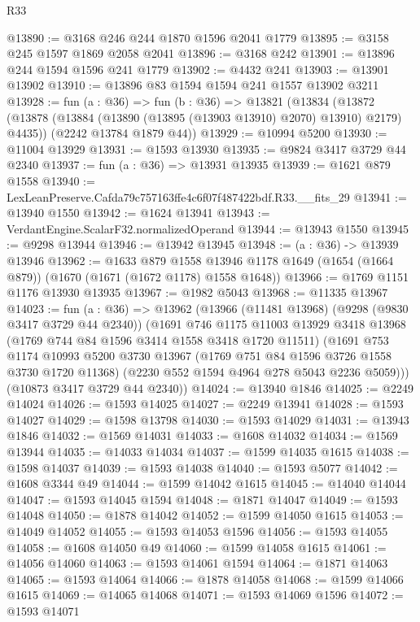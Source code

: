 \begin{lexlean}{R33}
\begin{coremodule}
@13890 := @3168 @246 @244 @1870 @1596 @2041 @1779
@13895 := @3158 @245 @1597 @1869 @2058 @2041
@13896 := @3168 @242
@13901 := @13896 @244 @1594 @1596 @241 @1779
@13902 := @4432 @241
@13903 := @13901 @13902
@13910 := @13896 @83 @1594 @1594 @241 @1557 @13902 @3211
@13928 := fun (a : @36) =>
  fun (b : @36) =>
  @13821
    (@13834
      (@13872 (@13878 (@13884 (@13890 (@13895 (@13903 @13910) @2070) @13910) @2179) @4435))
      (@2242 @13784 @1879 @44))
@13929 := @10994 @5200
@13930 := @11004 @13929
@13931 := @1593 @13930
@13935 := @9824 @3417 @3729 @44 @2340
@13937 := fun (a : @36) => @13931 @13935
@13939 := @1621 @879 @1558
@13940 := LexLeanPreserve.Cafda79c757163ffe4c6f07f487422bdf.R33.__fits_29
@13941 := @13940 @1550
@13942 := @1624 @13941
@13943 := VerdantEngine.ScalarF32.normalizedOperand
@13944 := @13943 @1550
@13945 := @9298 @13944
@13946 := @13942 @13945
@13948 := (a : @36) -> @13939 @13946
@13962 := @1633
    @879
    @1558
    @13946
    @1178
    @1649
    (@1654 (@1664 @879))
    (@1670 (@1671 (@1672 @1178) @1558 @1648))
@13966 := @1769 @1151 @1176 @13930 @13935
@13967 := @1982 @5043
@13968 := @11335 @13967
@14023 := fun (a : @36) =>
  @13962
    (@13966
      (@11481 @13968)
      (@9298 (@9830 @3417 @3729 @44 @2340))
      (@1691
        @746
        @1175
        @11003
        @13929
        @3418
        @13968
        (@1769 @744 @84 @1596 @3414 @1558 @3418 @1720 @11511)
        (@1691
          @753
          @1174
          @10993
          @5200
          @3730
          @13967
          (@1769 @751 @84 @1596 @3726 @1558 @3730 @1720 @11368)
          (@2230 @552 @1594 @4964 @278 @5043 @2236 @5059)))
      (@10873 @3417 @3729 @44 @2340))
@14024 := @13940 @1846
@14025 := @2249 @14024
@14026 := @1593 @14025
@14027 := @2249 @13941
@14028 := @1593 @14027
@14029 := @1598 @13798
@14030 := @1593 @14029
@14031 := @13943 @1846
@14032 := @1569 @14031
@14033 := @1608 @14032
@14034 := @1569 @13944
@14035 := @14033 @14034
@14037 := @1599 @14035 @1615
@14038 := @1598 @14037
@14039 := @1593 @14038
@14040 := @1593 @5077
@14042 := @1608 @3344 @49
@14044 := @1599 @14042 @1615
@14045 := @14040 @14044
@14047 := @1593 @14045 @1594
@14048 := @1871 @14047
@14049 := @1593 @14048
@14050 := @1878 @14042
@14052 := @1599 @14050 @1615
@14053 := @14049 @14052
@14055 := @1593 @14053 @1596
@14056 := @1593 @14055
@14058 := @1608 @14050 @49
@14060 := @1599 @14058 @1615
@14061 := @14056 @14060
@14063 := @1593 @14061 @1594
@14064 := @1871 @14063
@14065 := @1593 @14064
@14066 := @1878 @14058
@14068 := @1599 @14066 @1615
@14069 := @14065 @14068
@14071 := @1593 @14069 @1596
@14072 := @1593 @14071

\end{coremodule}
\end{lexlean}
